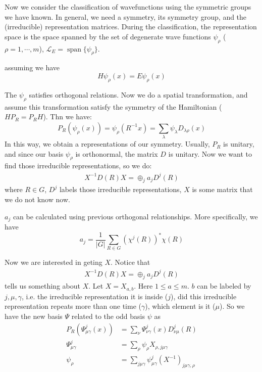 
Now we consider the classification of wavefunctions using the
symmetric groups we have known. In general, we need a symmetry, its
symmetry group, and the (irreducible) representation matrices.
During the classification, the representation space is the space
spanned by the set of degenerate wave functions $\psi_\rho$
($\rho=1,\cdots,m$), $\mathcal{L}_E=\operatorname{span}\{\psi_\rho\}$.

assuming we have
\begin{equation}
    H\psi_\rho(x) = E\psi_\rho(x)
\end{equation}

The $\psi_\rho$ satisfies orthogonal relations.
Now we do a spatial transformation, and assume this transformation
satisfy the symmetry of the Hamiltonian ($HP_R = P_R H$). Thn we have:
\begin{equation}
    P_R(\psi_\rho(x)) = \psi_\rho(R^{-1} x) = \sum_\lambda \psi_\lambda
    D_{\lambda\rho}(x)
\end{equation}
In this way, we obtain a representations of our symmetry. Usually,
$P_R$ is unitary, and since our basis $\psi_\rho$ is orthonormal, the
matrix $D$ is unitary. Now we want to find those irreducible
representations, so we do:
\begin{align}
    X^{-1} D(R) X = \oplus_j a_j D^j(R)
\end{align}
where $R\in G$, $D^j$ labels those irreducible representations, $X$ is
some matrix that we do not know now.

$a_j$ can be calculated using previous orthogonal relationships. More
specifically, we have
\begin{equation}
    a_j = \frac{1}{|G|} \sum_{R\in G} (\chi^j(R))^* \chi(R)
\end{equation}

Now we are interested in geting $X$. Notice that
\begin{align*}
    X^{-1} D(R) X = \oplus_j a_j D^j(R)
\end{align*}
tells us something about $X$. Let $X=X_{a,b}$. Here $1\leq a \leq m$.
$b$ can be labeled by $j,\mu,\gamma$, i.e. the irreducible
representation it is inside ($j$), did this irreducible representation
repeats more than one time ($\gamma$), which element is it ($\mu$). So
we have the new basis $\Psi$ related to the odd basis $\psi$ as
\begin{align}
    P_R(\Psi^j_{\mu\gamma}(x)) &= \sum_\nu
    \Psi^j_{\nu\gamma}(x)D^j_{\nu\mu}(R) \\
    \Psi^j_{\mu\gamma} &= \sum_{\rho} \psi_\rho X_{\rho,j\mu\gamma} \\
    \psi_\rho &= \sum_{j\mu\gamma} \psi^{j}_{\mu\gamma}
    (X^{-1})_{j\mu\gamma,\rho}
\end{align}

